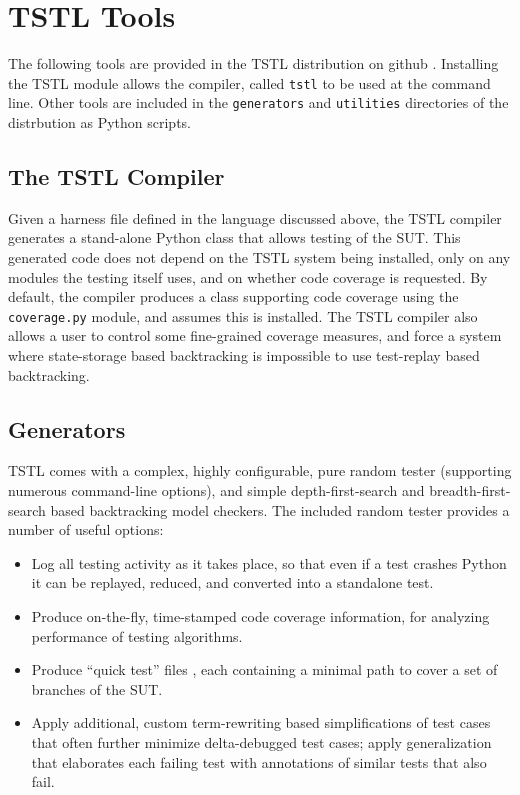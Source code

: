 \section{TSTL Tools}

The following tools are provided in the TSTL distribution on github \cite{tstl}.  Installing the TSTL module allows the compiler, called {\tt tstl} to be used at the command line.  Other tools are included in the {\tt generators} and {\tt utilities} directories of the distrbution as Python scripts.

\subsection{The TSTL Compiler}

Given a harness file defined in the language discussed above, the TSTL compiler generates a stand-alone Python class that allows testing of the SUT.  This generated code does not depend on the TSTL system being installed, only on any modules the testing itself uses, and on whether code coverage is requested.  By default, the compiler produces a class supporting code coverage using the {\tt coverage.py} module, and assumes this is installed.  The TSTL compiler also allows a user to control some fine-grained coverage measures, and force a system where state-storage based backtracking is impossible to use test-replay based backtracking.

\subsection{Generators}

TSTL comes with a complex, highly configurable, pure random tester (supporting numerous command-line options), and simple depth-first-search and breadth-first-search based backtracking model checkers.  The included random tester provides a number of useful options:

\begin{itemize}
\item Log all testing activity as it takes place, so that even if a test crashes Python it can be replayed, reduced, and converted into a standalone test.
\item Produce on-the-fly, time-stamped code coverage information, for analyzing performance of testing algorithms.
\item Produce ``quick test'' files \cite{icst14}, each containing a minimal path to cover a set of branches of the SUT.
\item Apply additional, custom term-rewriting based simplifications of test cases that often further minimize delta-debugged test cases; apply generalization that elaborates each failing test with annotations of similar tests that also fail.
\end{itemize}

